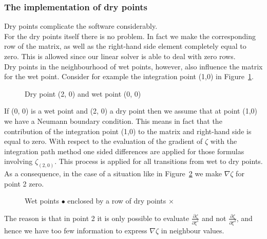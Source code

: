 \documentclass[12pt]{book}
\begin{document}
\subsubsection{The implementation of dry points}
\label{subsec1.4G}
%
Dry points complicate the software considerably.\\[2ex]
For the dry points itself there is no problem. In fact we make the
corresponding row of the matrix, as well as the right-hand side element
completely equal to zero. This is allowed since our linear solver is able
to deal with zero rows.\\[2ex]
Dry points in the neighbourhood of wet points, however, also influence the
matrix for the wet point. Consider for example the integration point (1,0)
in Figure~\ref{fig3G}.
\begin{figure}[htb]
\centerline{}
\caption{Dry point (2, 0) and wet  point (0, 0)}
\label{fig3G}
\end{figure}
If (0, 0) is a wet point and (2, 0) a dry point then we assume that at
point (1,0) we have a Neumann boundary condition. This means in fact that
the contribution of the integration point (1,0) to the matrix and right-hand
side is equal to zero. With respect to the evaluation of the gradient of
$\zeta$ with the integration path method one sided differences are applied
for those formulas involving $\zeta_{(2,0)}$. This process is applied for
all transitions from wet to dry points. As a consequence, in the case of a
situation like in Figure~\ref{fig4G} we make $\nabla \zeta$ for point 2
zero.
\begin{figure}[htb]
\centerline{}
\caption{Wet points $\bullet$ enclosed by a row of dry points $\times$}
\label{fig4G}
\end{figure}
The reason is that in point 2 it is only possible to evaluate
$\frac{\partial \zeta}{\partial \xi^{1}}$ and not $\frac{\partial
\zeta}{\partial \xi^{2}}$, and hence we have too few information to express
$\nabla \zeta$ in neighbour values.
%
\end{document}
